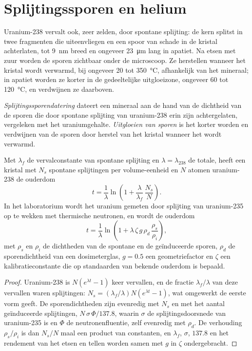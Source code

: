 \section{Splijtingssporen en helium}\label{sec:b3:advanced-geochronology:low-t}

Uranium-238 vervalt ook, zeer zelden, door spontane splijting: de kern
splitst in twee fragmenten die uiteenvliegen en een spoor van schade in de
kristal achterlaten, tot \qty{9}{nm} breed en ongeveer \qty{23}{\micro\metre} lang in
apatiet. Na etsen met zuur worden de sporen zichtbaar onder de microscoop.
Ze herstellen wanneer het kristal wordt verwarmd, bij ongeveer 20 tot \qty{350}{\celsius},
afhankelijk van het mineraal; in apatiet worden ze korter in de gedeeltelijke
uitgloeizone, ongeveer 60 tot \qty{120}{\celsius}, en verdwijnen ze daarboven.

\begin{definition}\label{def:b3:advanced-geochronology:fission-track}
\emph{Splijtingssporendatering} dateert een mineraal aan de hand van
de dichtheid van de sporen die door spontane splijting van
uranium-238 erin zijn achtergelaten, vergeleken met het uraniumgehalte. \emph{Uitgloeien
van sporen} is het korter worden en verdwijnen van de
sporen door herstel van het kristal wanneer het wordt verwarmd.
\end{definition}

\begin{theorem}[De splijtingssporenouderdom]\label{thm:b3:advanced-geochronology:fission-track}
Met $\lambda_f$ de vervalconstante van spontane splijting en $\lambda =
\lambda_{238}$ de totale, heeft een kristal met $N_s$ spontane splijtingen per
volume-eenheid en $N$ atomen uranium-238 de ouderdom
\[
t = \frac1\lambda\ln\left(1 + \frac{\lambda}{\lambda_f}\,\frac{N_s}{N}\right).
\]
In het laboratorium wordt het uranium gemeten door splijting van
uranium-235 op te wekken met thermische neutronen, en wordt de ouderdom
\[
t = \frac1\lambda\ln\left(1 + \lambda\,\zeta\,g\,\rho_d\,\frac{\rho_s}{\rho_i}\right),
\]
met $\rho_s$ en $\rho_i$ de dichtheden van de spontane en de geïnduceerde sporen,
$\rho_d$ de sporendichtheid van een dosimeterglas, $g = 0.5$ een geometriefactor
en $\zeta$ een kalibratieconstante die op standaarden van bekende ouderdom is bepaald.
\end{theorem}

\begin{proof}
Uranium-238 is $N(e^{\lambda t} - 1)$ keer vervallen, en de fractie
$\lambda_f/\lambda$ van deze vervallen waren splijtingen: $N_s =
(\lambda_f/\lambda)N(e^{\lambda t} - 1)$, wat omgewerkt de eerste vorm geeft.
De sporendichtheden zijn evenredig met $N_s$ en met het aantal geïnduceerde
splijtingen, $N\,\sigma\,\Phi/137.8$, waarin $\sigma$ de splijtingsdoorsnede
van uranium-235 is en $\Phi$ de neutronenfluentie, zelf evenredig met
$\rho_d$. De verhouding $\rho_s/\rho_i$ is dan $N_s/N$ maal een product van
constanten, en $\lambda_f$, $\sigma$, $137.8$ en het rendement van het etsen en
tellen worden samen met $g$ in $\zeta$ ondergebracht.
\end{proof}

